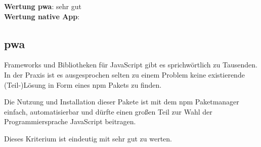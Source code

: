 \textbf{Wertung \ac{pwa}}: sehr gut\\
\textbf{Wertung native App}:  \\

\subsection{\ac{pwa}}
Frameworks und Bibliotheken für JavaScript gibt es sprichwörtlich zu Tausenden. In der Praxis ist es ausgesprochen selten zu einem Problem keine existierende (Teil-)Lösung in Form eines npm Pakets zu finden.

Die Nutzung und Installation dieser Pakete ist mit dem npm Paketmanager einfach, automatisierbar und dürfte einen großen Teil zur Wahl der Programmiersprache JavaScript beitragen.

Dieses Kriterium ist eindeutig mit sehr gut zu werten.